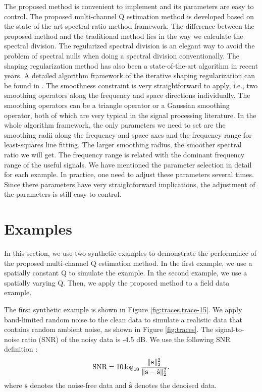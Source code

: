 The proposed method is convenient to implement and its parameters are easy to control. The proposed multi-channel Q estimation method is developed based on the state-of-the-art spectral ratio method framework. The difference between the proposed method and the traditional method lies in the way we calculate the spectral division. The regularized spectral division is an elegant way to avoid the problem of spectral nulls when doing a spectral division conventionally. The shaping regularization method has also been a state-of-the-art algorithm in recent years. A detailed algorithm framework of the iterative shaping regularization can be found in \cite{fomel2007shape}. The smoothness constraint is very straightforward to apply, i.e., two smoothing operators along the frequency and space directions individually. The smoothing operators can be a triangle operator or a Gaussian smoothing operator, both of which are very typical in the signal processing literature. In the whole algorithm framework, the only parameters we need to set are the smoothing radii along the frequency and space axes and the frequency range for least-squares line fitting. The larger smoothing radius, the smoother spectral ratio we will get. The frequency range is related with the dominant frequency range of the useful signals. We have mentioned the parameter selection in detail for each example. In practice, one need to adjust these parameters several times. Since there parameters have very straightforward implications, the adjustment of the parameters is still easy to control. 


\section{Examples}
In this section, we use two synthetic examples to demonstrate the performance of the proposed multi-channel Q estimation method. In the first example, we use a spatially constant Q to simulate the example. In the second example, we use a spatially varying Q. Then, we apply the proposed method to a field data example. 

The first synthetic example is shown in Figure \ref{fig:traces,trace-15}. We apply band-limited random noise to the clean data to simulate a realistic data that contains random ambient noise, as shown in Figure \ref{fig:traces}. The signal-to-noise ratio (SNR) of the noisy data is -4.5 dB. We use the following SNR definition \cite[]{yangkang2016irr5d,mostafa2016geo,mostafa2016bssa,mostafa2017geo,yangkang2017sgk}:
\begin{equation}
\label{eq:snr}
\text{SNR}=10\log_{10}\frac{\Arrowvert \mathbf{s} \Arrowvert_2^2}{\Arrowvert \mathbf{s} -\hat{\mathbf{s}}\Arrowvert_2^2}.
\end{equation}
where $\mathbf{s}$ denotes the noise-free data and $\hat{\mathbf{s}}$ denotes the denoised data. 

